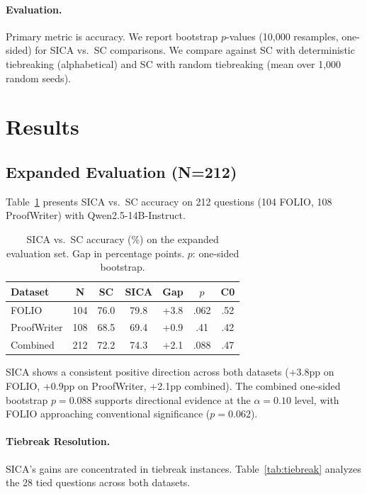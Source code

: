 \documentclass[11pt,a4paper]{article}
\begin{document}
\paragraph{Evaluation.} Primary metric is accuracy. We report bootstrap $p$-values (10,000 resamples, one-sided) for SICA vs.\ SC comparisons. We compare against SC with deterministic tiebreaking (alphabetical) and SC with random tiebreaking (mean over 1,000 random seeds).

\section{Results}
\label{sec:results}

\subsection{Expanded Evaluation (N=212)}
\label{sec:expanded}

Table~\ref{tab:expanded} presents SICA vs.\ SC accuracy on 212 questions (104 FOLIO, 108 ProofWriter) with Qwen2.5-14B-Instruct.

\begin{table}[t]
\centering
\small
\begin{tabular}{lcccccc}
\toprule
\textbf{Dataset} & \textbf{N} & \textbf{SC} & \textbf{SICA} & \textbf{Gap} & \textbf{$p$} & \textbf{C0} \\
\midrule
FOLIO        & 104 & 76.0 & 79.8 & +3.8 & .062 & .52 \\
ProofWriter  & 108 & 68.5 & 69.4 & +0.9 & .41  & .42 \\
\midrule
Combined     & 212 & 72.2 & 74.3 & +2.1 & .088 & .47 \\
\bottomrule
\end{tabular}
\caption{SICA vs.\ SC accuracy (\%) on the expanded evaluation set. Gap in percentage points. $p$: one-sided bootstrap.}
\label{tab:expanded}
\end{table}

SICA shows a consistent positive direction across both datasets (+3.8pp on FOLIO, +0.9pp on ProofWriter, +2.1pp combined). The combined one-sided bootstrap $p{=}0.088$ supports directional evidence at the $\alpha{=}0.10$ level, with FOLIO approaching conventional significance ($p{=}0.062$).

\paragraph{Tiebreak Resolution.} SICA's gains are concentrated in tiebreak instances. Table~\ref{tab:tiebreak} analyzes the 28 tied questions across both datasets.
\end{document}
